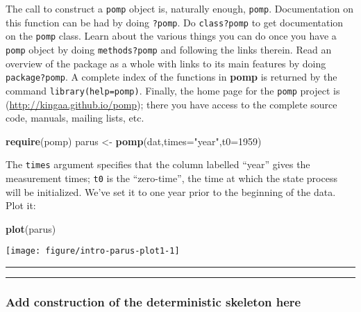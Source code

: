 \documentclass[]{article}
\newenvironment{Shaded}{\begin{snugshade}}{\end{snugshade}}
\newcommand{\KeywordTok}[1]{\textcolor[rgb]{0.13,0.29,0.53}{\textbf{#1}}}
\newcommand{\DataTypeTok}[1]{\textcolor[rgb]{0.13,0.29,0.53}{#1}}
\newcommand{\DecValTok}[1]{\textcolor[rgb]{0.00,0.00,0.81}{#1}}
\newcommand{\StringTok}[1]{\textcolor[rgb]{0.31,0.60,0.02}{#1}}
\newcommand{\NormalTok}[1]{#1}
\begin{document}
The call to construct a \texttt{pomp} object is, naturally enough,
\texttt{pomp}. Documentation on this function can be had by doing
\texttt{?pomp}. Do \texttt{class?pomp} to get documentation on the
\texttt{pomp} class. Learn about the various things you can do once you
have a \texttt{pomp} object by doing \texttt{methods?pomp} and following
the links therein. Read an overview of the package as a whole with links
to its main features by doing \texttt{package?pomp}. A complete index of
the functions in \textbf{pomp} is returned by the command
\texttt{library(help=pomp)}. Finally, the home page for the
\texttt{pomp} project is (\url{http://kingaa.github.io/pomp}); there you
have access to the complete source code, manuals, mailing lists, etc.

\begin{Shaded}
\begin{Highlighting}[]
\KeywordTok{require}\NormalTok{(pomp)}
\NormalTok{parus <-}\StringTok{ }\KeywordTok{pomp}\NormalTok{(dat,}\DataTypeTok{times=}\StringTok{"year"}\NormalTok{,}\DataTypeTok{t0=}\DecValTok{1959}\NormalTok{)}
\end{Highlighting}
\end{Shaded}

The \texttt{times} argument specifies that the column labelled ``year''
gives the measurement times; \texttt{t0} is the ``zero-time'', the time
at which the state process will be initialized. We've set it to one year
prior to the beginning of the data. Plot it:

\begin{Shaded}
\begin{Highlighting}[]
\KeywordTok{plot}\NormalTok{(parus)}
\end{Highlighting}
\end{Shaded}

\begin{center}\texttt{[image: figure/intro-parus-plot1-1]} \end{center}

\begin{center}\rule{0.5\linewidth}{\linethickness}\end{center}

\begin{center}\rule{0.5\linewidth}{\linethickness}\end{center}

\subsubsection{Add construction of the deterministic skeleton
here}\label{add-construction-of-the-deterministic-skeleton-here}
\end{document}
